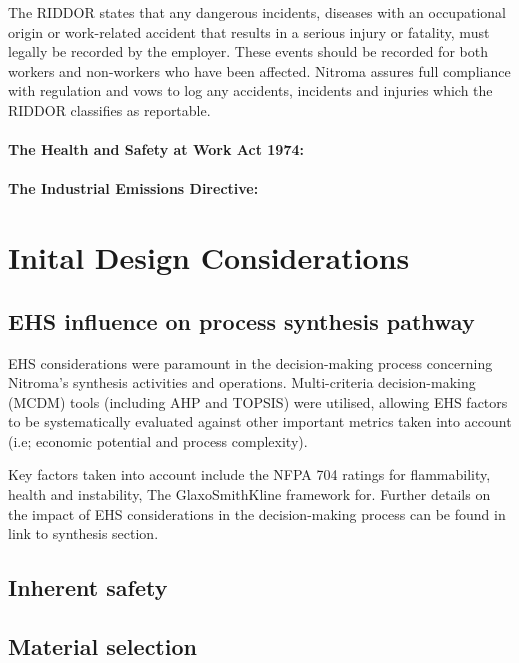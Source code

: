 The RIDDOR states that any dangerous incidents, diseases with an occupational origin or work-related accident that results in a serious injury or fatality, must legally be recorded by the employer. These events should be recorded for both workers and non-workers who have been affected. Nitroma assures full compliance with regulation and vows to log any accidents, incidents and injuries which the RIDDOR classifies as reportable.

\paragraph{The Health and Safety at Work Act 1974:}

\paragraph{The Industrial Emissions Directive:}
 
 
\section{Inital Design Considerations}

\subsection{EHS influence on process synthesis pathway}

EHS considerations were paramount in the decision-making process concerning Nitroma’s synthesis activities and operations. Multi-criteria decision-making (MCDM) tools (including AHP and TOPSIS) were utilised, allowing EHS factors to be systematically evaluated against other important metrics taken into account (i.e; economic potential and process complexity). 



Key factors taken into account include the NFPA 704 ratings for flammability, health and instability, 
The GlaxoSmithKline framework for. Further details on the impact of EHS considerations in the decision-making process can be found in link to synthesis section. 










\subsection{Inherent safety}
\subsection{Material selection}


